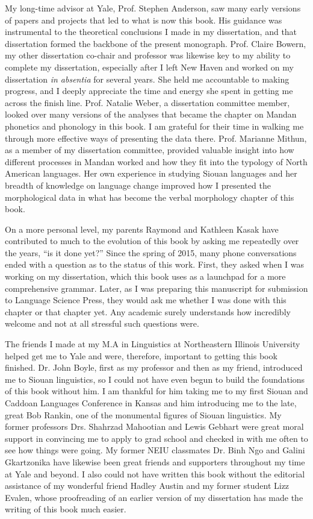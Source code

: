 My long-time advisor at Yale, Prof. Stephen Anderson, saw many early versions of papers and projects that led to what is now this book. His guidance was instrumental to the theoretical conclusions I made in my dissertation, and that dissertation formed the backbone of the present monograph. Prof. Claire Bowern, my other dissertation co-chair and professor was likewise key to my ability to complete my dissertation, especially after I left New Haven and worked on my dissertation \textit{in absentia} for several years. She held me accountable to making progress, and I deeply appreciate the time and energy she spent in getting me across the finish line. Prof. Natalie Weber, a dissertation committee member, looked over many versions of the analyses that became the chapter on Mandan phonetics and phonology in this book. I am grateful for their time in walking me through more effective ways of presenting the data there. Prof. Marianne Mithun, as a member of my dissertation committee, provided valuable insight into how different processes in Mandan worked and how they fit into the typology of North American languages. Her own experience in studying Siouan languages and her breadth of knowledge on language change improved how I presented the morphological data in what has become the verbal morphology chapter of this book.

On a more personal level, my parents Raymond and Kathleen Kasak have contributed to much to the evolution of this book by asking me repeatedly over the years, ``is it done yet?'' Since the spring of 2015, many phone conversations ended with a question as to the status of this work. First, they asked when I was working on my dissertation, which this book uses as a launchpad for a more comprehensive grammar. Later, as I was preparing this manuscript for submission to Language Science Press, they would ask me whether I was done with this chapter or that chapter yet. Any academic surely understands how incredibly welcome and not at all stressful such questions were.

The friends I made at my M.A in Linguistics at Northeastern Illinois University helped get me to Yale and were, therefore, important to getting this book finished. Dr. John Boyle, first as my professor and then as my friend, introduced me to Siouan linguistics, so I could not have even begun to build the foundations of this book without him. I am thankful for him taking me to my first Siouan and Caddoan Languages Conference in Kansas and him introducing me to the late, great Bob Rankin, one of the monumental figures of Siouan linguistics. My former professors Drs. Shahrzad Mahootian and Lewis Gebhart were great moral support in convincing me to apply to grad school and checked in with me often to see how things were going. My former NEIU classmates Dr. Binh Ngo and Galini Gkartzonika have likewise been great friends and supporters throughout my time at Yale and beyond. I also could not have written this book without the editorial assistance of my wonderful friend Hadley Austin and my former student Lizz Evalen, whose proofreading of an earlier version of my dissertation has made the writing of this book much easier.

